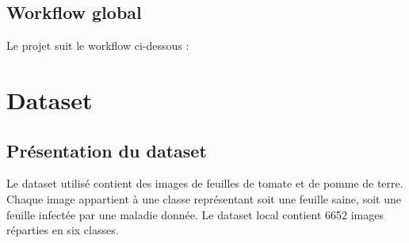 \documentclass[12pt,a4paper]{report}
\begin{document}
\section{Workflow global}
Le projet suit le workflow ci-dessous :

\begin{center}
\end{center}

\chapter{Dataset}

\section{Présentation du dataset}
Le dataset utilisé contient des images de feuilles de tomate et de pomme de terre. Chaque image appartient à une classe représentant soit une feuille saine, soit une feuille infectée par une maladie donnée. Le dataset local contient 6652 images réparties en six classes.
\end{document}
